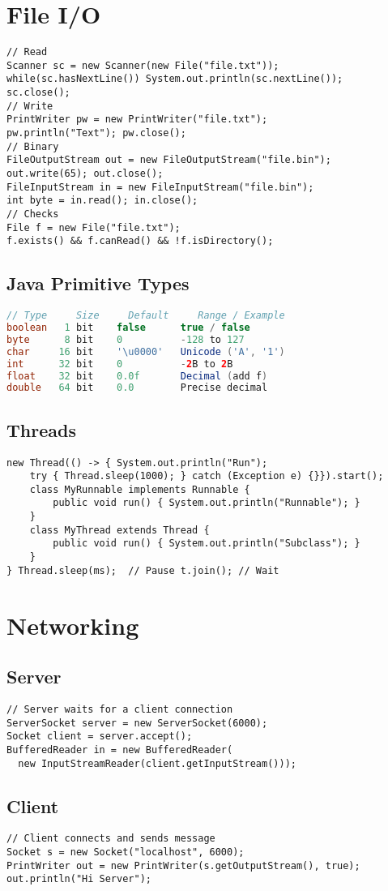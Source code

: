 \documentclass[10pt]{article}
\begin{document}
\begin{multicols}{2}
\section*{File I/O}
\begin{lstlisting}
// Read
Scanner sc = new Scanner(new File("file.txt"));
while(sc.hasNextLine()) System.out.println(sc.nextLine());
sc.close();
// Write
PrintWriter pw = new PrintWriter("file.txt");
pw.println("Text"); pw.close();
// Binary
FileOutputStream out = new FileOutputStream("file.bin");
out.write(65); out.close();
FileInputStream in = new FileInputStream("file.bin");
int byte = in.read(); in.close();
// Checks
File f = new File("file.txt");
f.exists() && f.canRead() && !f.isDirectory();
\end{lstlisting}
\subsection*{Java Primitive Types }
\begin{lstlisting}[language=Java, basicstyle=\footnotesize\ttfamily]
// Type     Size     Default     Range / Example
boolean   1 bit    false      true / false
byte      8 bit    0          -128 to 127
char     16 bit    '\u0000'   Unicode ('A', '1')
int      32 bit    0          -2B to 2B
float    32 bit    0.0f       Decimal (add f)
double   64 bit    0.0        Precise decimal
\end{lstlisting}
\subsection*{Threads}
\begin{lstlisting}
new Thread(() -> { System.out.println("Run");
    try { Thread.sleep(1000); } catch (Exception e) {}}).start();
    class MyRunnable implements Runnable {
        public void run() { System.out.println("Runnable"); }
    }
    class MyThread extends Thread {
        public void run() { System.out.println("Subclass"); }
    }
} Thread.sleep(ms);  // Pause t.join(); // Wait 
\end{lstlisting}

\section*{Networking}
\subsection*{Server}
\begin{lstlisting}
// Server waits for a client connection
ServerSocket server = new ServerSocket(6000);
Socket client = server.accept();
BufferedReader in = new BufferedReader(
  new InputStreamReader(client.getInputStream()));
\end{lstlisting}

\subsection*{Client}
\begin{lstlisting}
// Client connects and sends message
Socket s = new Socket("localhost", 6000);
PrintWriter out = new PrintWriter(s.getOutputStream(), true);
out.println("Hi Server");
\end{lstlisting}


\end{multicols}
\end{document}
